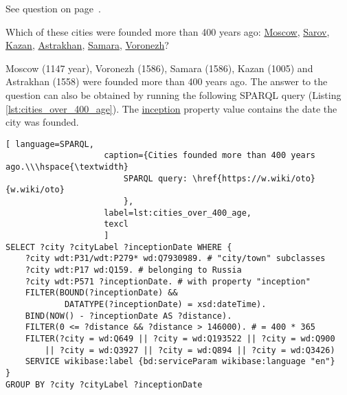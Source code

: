 See question on page~\pageref{question:cities_geographic_objects}.


\begin{exercise}%
    \label{answer:cities_over_400_age}
Which of these cities were founded more than 400 years ago: \href{https://w.wiki/pzt}{Moscow}, \href{https://w.wiki/pzu}{Sarov}, \href{https://w.wiki/pzx}{Kazan}, \href{https://w.wiki/pzy}{Astrakhan}, \href{https://w.wiki/pzz}{Samara}, \href{https://w.wiki/pz$}{Voronezh}?
\end{exercise}

Moscow (1147 year), Voronezh (1586), Samara (1586), Kazan (1005) and Astrakhan (1558) were founded more than 400 years ago. The answer to the question can also be obtained by running the following SPARQL query (Listing \ref{lst:cities_over_400_age}). The \href{https://www.wikidata.org/wiki/Property:P571}{inception} property value contains the date the city was founded.

\begin{lstlisting}[ language=SPARQL, 
                    caption={Cities founded more than 400 years ago.\\\hspace{\textwidth}
                        SPARQL query: \href{https://w.wiki/oto}{w.wiki/oto}
                        },
                    label=lst:cities_over_400_age,
                    texcl 
                    ]
SELECT ?city ?cityLabel ?inceptionDate WHERE {
	?city wdt:P31/wdt:P279* wd:Q7930989. # "city/town" subclasses
	?city wdt:P17 wd:Q159. # belonging to Russia
	?city wdt:P571 ?inceptionDate. # with property "inception"
	FILTER(BOUND(?inceptionDate) && 
			DATATYPE(?inceptionDate) = xsd:dateTime).
	BIND(NOW() - ?inceptionDate AS ?distance).
	FILTER(0 <= ?distance && ?distance > 146000). # = 400 * 365
	FILTER(?city = wd:Q649 || ?city = wd:Q193522 || ?city = wd:Q900
		|| ?city = wd:Q3927 || ?city = wd:Q894 || ?city = wd:Q3426)
	SERVICE wikibase:label {bd:serviceParam wikibase:language "en"}
}
GROUP BY ?city ?cityLabel ?inceptionDate
\end{lstlisting}%

